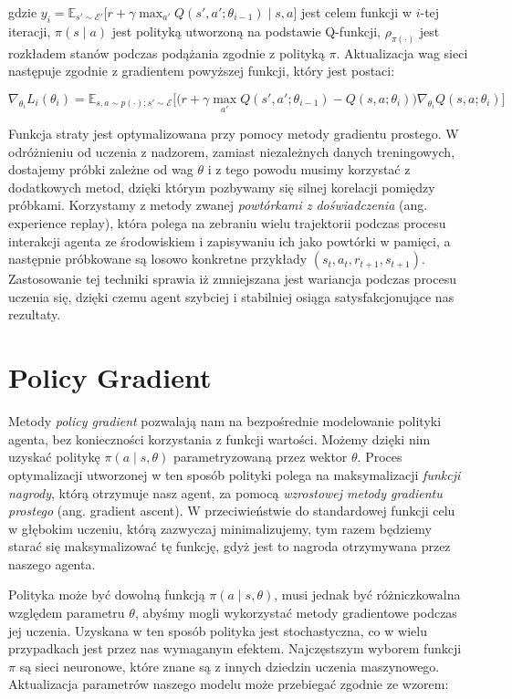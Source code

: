 \documentclass[licencjacka]{pracamgr}
\begin{document}
gdzie $ y_i = \mathbb{E}_{s' \sim \mathcal{E}'} \big[ r + \gamma \max_{a'} Q(s', a'; \theta_{i - 1}) \mid s, a \big] $ jest celem funkcji w $i$-tej iteracji, $\pi(s \mid a)$ jest polityką utworzoną na podstawie Q-funkcji, $\rho_{\pi(\cdot)} $ jest rozkładem stanów podczas podążania zgodnie z polityką $\pi$. Aktualizacja wag sieci następuje zgodnie z gradientem powyższej funkcji, który jest postaci:

$$ \nabla_{\theta_i}L_i(\theta_i) = \mathbb{E}_{s, a \sim p(\cdot); s' \sim \mathcal{E}} 
\Big[ \Big( r + \gamma \max_{a'} Q(s', a'; \theta_{i - 1}) - Q(s, a; \theta_i) \Big) \nabla_{\theta_i} Q(s, a; \theta_i) \Big] $$

Funkcja straty jest optymalizowana przy pomocy metody gradientu prostego. W odróżnieniu od uczenia z nadzorem, zamiast niezależnych danych treningowych, dostajemy próbki zależne od wag $\theta$ i z tego powodu musimy korzystać z dodatkowych metod, dzięki którym pozbywamy się silnej korelacji pomiędzy próbkami. Korzystamy z metody zwanej \emph{powtórkami z doświadczenia} (ang. experience replay), która polega na zebraniu wielu trajektorii podczas procesu interakcji agenta ze środowiskiem i zapisywaniu ich jako powtórki w pamięci, a następnie próbkowane są losowo konkretne przykłady $(s_t, a_t, r_{t+1}, s_{t+1})$. Zastosowanie tej techniki sprawia iż zmniejszana jest wariancja podczas procesu uczenia się, dzięki czemu agent szybciej i stabilniej osiąga satysfakcjonujące nas rezultaty.


\section{Policy Gradient}

Metody \emph{policy gradient} \cite{policy-gradient-sutton} pozwalają nam na bezpośrednie modelowanie polityki agenta, bez konieczności korzystania z funkcji wartości. Możemy dzięki nim uzyskać politykę $\pi(a \mid s, \theta)$ parametryzowaną przez wektor $\theta$. Proces optymalizacji utworzonej w ten sposób polityki polega na maksymalizacji \emph{funkcji nagrody}, którą otrzymuje nasz agent, za pomocą \emph{wzrostowej metody gradientu prostego} (ang. gradient ascent). W przeciwieństwie do standardowej funkcji celu w głębokim uczeniu, którą zazwyczaj minimalizujemy, tym razem będziemy starać się maksymalizować tę funkcję, gdyż jest to nagroda otrzymywana przez naszego agenta.

Polityka może być dowolną funkcją $\pi(a \mid s, \theta)$, musi jednak być różniczkowalna względem parametru $\theta$, abyśmy mogli wykorzystać metody gradientowe podczas jej uczenia. Uzyskana w ten sposób polityka jest stochastyczna, co w wielu przypadkach jest przez nas wymaganym efektem. Najczęstszym wyborem funkcji $\pi$ są sieci neuronowe, które znane są z innych dziedzin uczenia maszynowego. Aktualizacja parametrów naszego modelu może przebiegać zgodnie ze wzorem:
\end{document}
